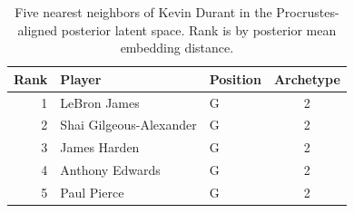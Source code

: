 \begin{table}[htbp]
  \centering\small
  \begin{tabular}{rllc}
    \toprule
    Rank & Player & Position & Archetype \\
    \midrule
    1 & LeBron James & G & 2 \\
    2 & Shai Gilgeous-Alexander & G & 2 \\
    3 & James Harden & G & 2 \\
    4 & Anthony Edwards & G & 2 \\
    5 & Paul Pierce & G & 2 \\
    \bottomrule
  \end{tabular}
  \caption{Five nearest neighbors of Kevin Durant in the Procrustes-aligned posterior latent space. Rank is by posterior mean embedding distance.}
  \label{tab:Kevin_Durant_neighbors}
\end{table}

